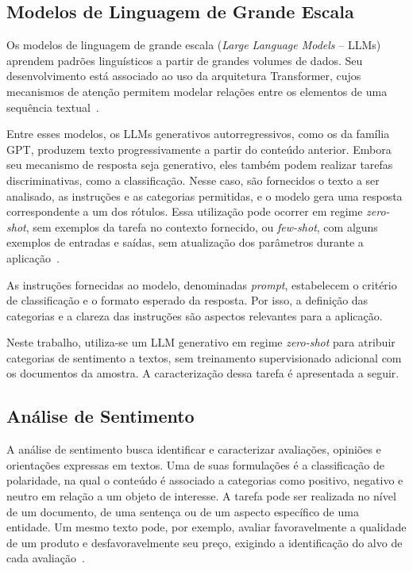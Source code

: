 \subsection{Modelos de Linguagem de Grande Escala}
\label{subsec:llms}

Os modelos de linguagem de grande escala (\textit{Large Language
Models} -- LLMs) aprendem padrões linguísticos a partir de grandes
volumes de dados. Seu desenvolvimento está associado ao uso da
arquitetura Transformer, cujos mecanismos de atenção permitem
modelar relações entre os elementos de uma sequência
textual~\cite{vaswani2017}.

Entre esses modelos, os LLMs generativos autorregressivos, como
os da família GPT, produzem texto progressivamente a partir do
conteúdo anterior. Embora seu mecanismo de resposta seja
generativo, eles também podem realizar tarefas discriminativas,
como a classificação. Nesse caso, são fornecidos o texto a ser
analisado, as instruções e as categorias permitidas, e o modelo
gera uma resposta correspondente a um dos rótulos. Essa utilização
pode ocorrer em regime \textit{zero-shot}, sem exemplos da tarefa
no contexto fornecido, ou \textit{few-shot}, com alguns exemplos
de entradas e saídas, sem atualização dos parâmetros durante
a aplicação~\cite{brown2020language}.

As instruções fornecidas ao modelo, denominadas \textit{prompt},
estabelecem o critério de classificação e o formato esperado da
resposta. Por isso, a definição das categorias e a clareza das
instruções são aspectos relevantes para a aplicação.

Neste trabalho, utiliza-se um LLM generativo em regime
\textit{zero-shot} para atribuir categorias de sentimento a textos,
sem treinamento supervisionado adicional com os documentos da
amostra. A caracterização dessa tarefa é apresentada a seguir.

\subsection{Análise de Sentimento}
\label{subsec:analise_sentimento}

A análise de sentimento busca identificar e caracterizar avaliações, opiniões e orientações expressas em textos. Uma de suas formulações é a classificação de polaridade, na qual o conteúdo é associado a categorias como positivo, negativo e neutro em relação a um objeto de interesse. A tarefa pode ser realizada no nível de um documento, de uma sentença ou de um aspecto específico de uma entidade. Um mesmo texto pode, por exemplo, avaliar favoravelmente a qualidade de um produto e desfavoravelmente seu preço, exigindo a identificação do alvo de cada avaliação~\cite{pang2008opinion}.

